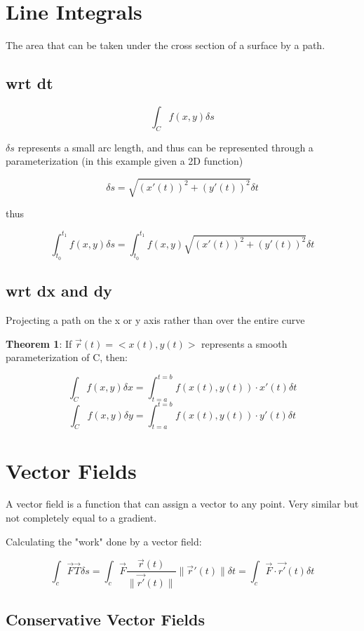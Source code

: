 \documentclass{article}
\begin{document}
\section{Line Integrals}

The area that can be taken under the cross section of a surface by a path.

\subsection{wrt dt}

$$\int_C f(x, y) \delta s$$

$\delta s$ represents a small arc length, and thus can be represented through a parameterization (in this example given a 2D function)

$$\delta s = \sqrt{(x'(t))^2 + (y'(t))^2} \delta t$$

thus

$$\int_{t_0}^{t_1} f(x, y) \delta s = \int_{t_0}^{t_1} f(x, y) \sqrt{(x'(t)) ^2 + (y'(t))^2} \delta t$$

\subsection{wrt dx and dy}

Projecting a path on the x or y axis rather than over the entire curve

\textbf{Theorem 1}: If $\vec{r}(t) = <x(t), y(t)>$ represents a smooth parameterization of C, then:

$$\int_C f(x, y) \delta x = \int_{t = a}^{t = b} f(x(t), y(t)) \cdot x'(t) \delta t$$
$$\int_C f(x, y) \delta y = \int_{t = a}^{t = b} f(x(t), y(t)) \cdot y'(t) \delta t$$


\section{Vector Fields}

A vector field is a function that can assign a vector to any point. Very similar but not completely equal to a gradient.

Calculating the "work" done by a vector field:

$$\int_c \vec{F} \vec{T} \delta s = \int_c \vec{F} \frac{\vec{r}(t)}{\|\vec{r'}(t)\|} \|\vec{ r}'(t) \| \delta t = \int_c \vec{F} \cdot \vec{r'}(t) \delta t$$


\subsection{Conservative Vector Fields}
\end{document}
